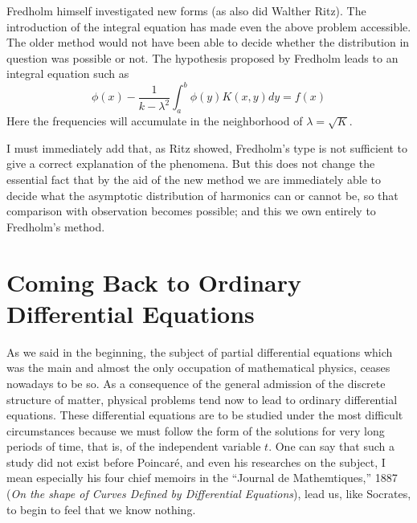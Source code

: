 \documentclass[12pt,oneside]{book}
\newcommand{\iit}[1]{\textit{#1}}
\begin{document}
Fredholm himself investigated new forms (as also did Walther Ritz). The
introduction of the integral equation has made even the above problem
accessible. The older method would not have been able to decide whether the
distribution in question was possible or not. The hypothesis proposed by
Fredholm leads to an integral equation such as
\begin{equation}
    \label{2.2}
    \phi(x)-\frac{1}{k-\lambda^2}\int_a^b\phi(y)K(x,y)dy=f(x)
\end{equation}
Here the frequencies will accumulate in the neighborhood of $\lambda=\sqrt{K}$.
\par

I must immediately add that, as Ritz showed, Fredholm's type is not sufficient
to give a correct explanation of the phenomena. But this does not change the
essential fact that by the aid of the new method we are immediately able to
decide what the asymptotic distribution of harmonics can or cannot be, so that
comparison with observation becomes possible; and this we own entirely to
Fredholm's method. \par

\section{Coming Back to Ordinary Differential Equations}

As we said in the beginning, the subject of partial differential equations which
was the main and almost the only occupation of mathematical physics, ceases
nowadays to be so. As a consequence of the general admission of the discrete
structure of matter, physical problems tend now to lead to ordinary differential
equations. These differential equations are to be studied under the most
difficult circumstances because we must follow the form of the solutions for
very long periods of time, that is, of the independent variable $t$. One can say
that such a study did not exist before Poincar\'e, and even his researches on
the subject, I mean especially his four chief memoirs in the ``Journal de
Mathemtiques,'' 1887 (\iit{On the shape of Curves Defined by Differential
Equations}), lead us, like Socrates, to begin to feel that we know nothing. \par
\end{document}
